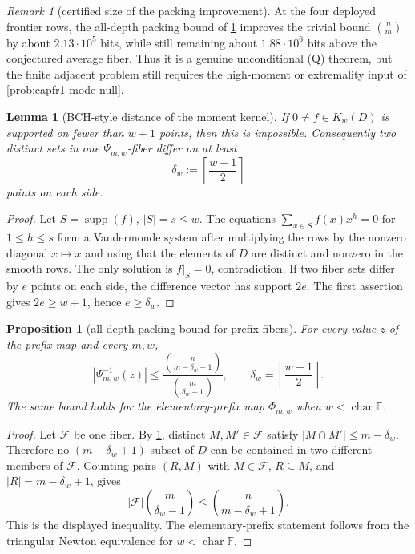 \documentclass[11pt]{article}
\newtheorem{lemma}[lemma]{Lemma}
\newtheorem{proposition}[proposition]{Proposition}
\theoremstyle{definition}
\theoremstyle{remark}
\newtheorem{remark}[remark]{Remark}
\newcommand{\F}{\mathbb{F}}
\begin{document}
\begin{remark}[certified size of the packing improvement]\label{rem:capfr1-packing-bits}
At the four deployed frontier rows, the all-depth packing bound of \cref{prop:capfr1-prefix-packing} improves the trivial bound \(\binom n m\) by about \(2.13\cdot10^5\) bits, while still remaining about \(1.88\cdot10^6\) bits above the conjectured average fiber.  Thus it is a genuine unconditional \textup{(Q)} theorem, but the finite adjacent problem still requires the high-moment or extremality input of \cref{prob:capfr1-mode-null}.
\end{remark}

\begin{lemma}[BCH-style distance of the moment kernel]\label{lem:capfr1-kernel-distance}
If \(0\ne f\in K_w(D)\) is supported on fewer than \(w+1\) points, then this is impossible.  Consequently two distinct sets in one \(\Psi_{m,w}\)-fiber differ on at least
\[
        \delta_w:=\left\lceil \frac{w+1}{2}\right\rceil
\]
points on each side.
\end{lemma}

\begin{proof}
Let \(S=\operatorname{supp}(f)\), \(|S|=s\le w\).  The equations \(\sum_{x\in S}f(x)x^h=0\) for \(1\le h\le s\) form a Vandermonde system after multiplying the rows by the nonzero diagonal \(x\mapsto x\) and using that the elements of \(D\) are distinct and nonzero in the smooth rows.  The only solution is \(f|_S=0\), contradiction.  If two fiber sets differ by \(e\) points on each side, the difference vector has support \(2e\).  The first assertion gives \(2e\ge w+1\), hence \(e\ge\delta_w\).
\end{proof}

\begin{proposition}[all-depth packing bound for prefix fibers]\label{prop:capfr1-prefix-packing}
For every value \(z\) of the prefix map and every \(m,w\),
\[
        |\Psi_{m,w}^{-1}(z)|
        \le
        \frac{\binom{n}{m-\delta_w+1}}{\binom{m}{\delta_w-1}},
        \qquad
        \delta_w=\left\lceil \frac{w+1}{2}\right\rceil .
\]
The same bound holds for the elementary-prefix map \(\Phi_{m,w}\) when \(w<\operatorname{char}\F\).
\end{proposition}

\begin{proof}
Let \(\mathcal F\) be one fiber.  By \cref{lem:capfr1-kernel-distance}, distinct \(M,M'\in\mathcal F\) satisfy \(|M\cap M'|\le m-\delta_w\).  Therefore no \((m-\delta_w+1)\)-subset of \(D\) can be contained in two different members of \(\mathcal F\).  Counting pairs \((R,M)\) with \(M\in\mathcal F\), \(R\subseteq M\), and \(|R|=m-\delta_w+1\), gives
\[
        |\mathcal F|\binom{m}{\delta_w-1}
        \le
        \binom n {m-\delta_w+1}.
\]
This is the displayed inequality.  The elementary-prefix statement follows from the triangular Newton equivalence for \(w<\operatorname{char}\F\).
\end{proof}
\end{document}
